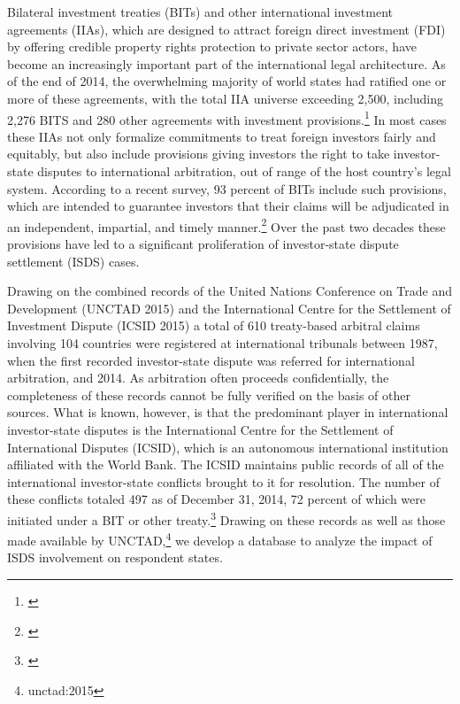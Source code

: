 \documentclass[12pt,onesided]{amsart}
\begin{document}
Bilateral investment treaties (BITs) and other international investment agreements (IIAs), which are designed to attract foreign direct investment (FDI) by offering credible property rights protection to private sector actors, have become an increasingly important part of the international legal architecture. As of the end of 2014, the overwhelming majority of world states had ratified one or more of these agreements, with the total IIA universe exceeding 2,500, including 2,276 BITS and 280 other agreements with investment provisions.\footnote{\citet{unctad:2015}} In most cases these IIAs not only formalize commitments to treat foreign investors fairly and equitably, but also include provisions giving investors the right to take investor-state disputes to international arbitration, out of range of the host country's legal system. According to a recent survey, 93 percent of BITs include such provisions, which are intended to guarantee investors that their claims will be adjudicated in an independent, impartial, and timely manner.\footnote{\citet[p. 8]{gaukordger:gordon:2012}} Over the past two decades these provisions have led to a significant proliferation of investor-state dispute settlement (ISDS) cases.

Drawing on the combined records of the United Nations Conference on Trade and Development (UNCTAD 2015) and the International Centre for the Settlement of Investment Dispute (ICSID 2015) a total of 610 treaty-based arbitral claims involving 104 countries were registered at international tribunals between 1987, when the first recorded investor-state dispute was referred for international arbitration, and 2014. As arbitration often proceeds confidentially, the completeness of these records cannot be fully verified on the basis of other sources. What is known, however, is that the predominant player in international investor-state disputes is the International Centre for the Settlement of International Disputes (ICSID), which is an autonomous international institution affiliated with the World Bank. The ICSID maintains public records of all of the international investor-state conflicts brought to it for resolution. The number of these conflicts totaled 497 as of December 31, 2014, 72 percent of which were initiated under a BIT or other treaty.\footnote{\citet[p. 7, 10]{icsid:2015}} Drawing on these records as well as those made available by UNCTAD,\footnote{unctad:2015} we develop a database to analyze the impact of ISDS involvement on respondent states. 
\end{document}
